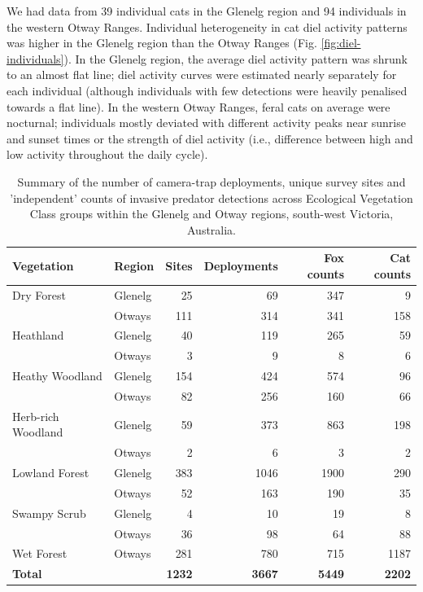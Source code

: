 \documentclass[11pt,a4paper,titlepage,twoside,openright]{style/unimelbthesis}
\begin{document}
\begin{mainmatter}
We had data from 39 individual cats in the Glenelg region and 94 individuals in the western Otway Ranges. Individual heterogeneity in cat diel activity patterns was higher in the Glenelg region than the Otway Ranges (Fig. \ref{fig:diel-individuals}). In the Glenelg region, the average diel activity pattern was shrunk to an almost flat line; diel activity curves were estimated nearly separately for each individual (although individuals with few detections were heavily penalised towards a flat line). In the western Otway Ranges, feral cats on average were nocturnal; individuals mostly deviated with different activity peaks near sunrise and sunset times or the strength of diel activity (i.e., difference between high and low activity throughout the daily cycle).

\newpage

\begingroup\fontsize{10}{12}\selectfont
\begin{longtable}[t]{llrrrr}
\caption{\label{tab:diel-tab1}Summary of the number of camera-trap deployments, unique survey sites and 'independent' counts of invasive predator detections across Ecological Vegetation Class groups within the Glenelg and Otway regions, south-west Victoria, Australia.}\\
\toprule
Vegetation & Region & Sites & Deployments & Fox counts & Cat counts\\
\midrule
Dry Forest & Glenelg & 25 & 69 & 347 & 9\\
 & Otways & 111 & 314 & 341 & 158\\
Heathland & Glenelg & 40 & 119 & 265 & 59\\
 & Otways & 3 & 9 & 8 & 6\\
Heathy Woodland & Glenelg & 154 & 424 & 574 & 96\\
\addlinespace
 & Otways & 82 & 256 & 160 & 66\\
Herb-rich Woodland & Glenelg & 59 & 373 & 863 & 198\\
 & Otways & 2 & 6 & 3 & 2\\
Lowland Forest & Glenelg & 383 & 1046 & 1900 & 290\\
 & Otways & 52 & 163 & 190 & 35\\
\addlinespace
Swampy Scrub & Glenelg & 4 & 10 & 19 & 8\\
 & Otways & 36 & 98 & 64 & 88\\
Wet Forest & Otways & 281 & 780 & 715 & 1187\\
\textbf{Total} & \textbf{} & \textbf{1232} & \textbf{3667} & \textbf{5449} & \textbf{2202}\\
\bottomrule
\end{longtable}
\endgroup{}


\end{mainmatter}
\end{document}
